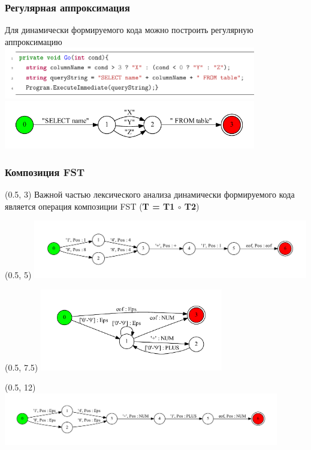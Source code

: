 \documentclass{beamer}
\begin{document}
\begin{frame}
  \transwipe[direction=90]
  \frametitle{Регулярная аппроксимация}
  Для динамически формируемого кода можно построить регулярную 
  аппроксимацию \\[2\baselineskip]
  \includegraphics[width=11cm]{pictures/approx_code.pdf} \\
  \includegraphics[width=11cm]{pictures/approx_fsa.pdf}
\end{frame}

\begin{frame}
  \transwipe[direction=90]
  \frametitle{Композиция FST}
  \begin{textblock}{12}(0.5, 3)
    Важной частью лексического анализа динамически формируемого
    кода является операция композиции FST (\textbf{T = T1 $\circ$ T2})
  \end{textblock}
  \begin{textblock}{12}(0.5, 5)
    \includegraphics[width=12cm]{pictures/example_.pdf}
  \end{textblock}
  \begin{textblock}{8}(0.5, 7.5)
    \includegraphics[width=8cm]{pictures/lexer_.pdf}
  \end{textblock}
  \begin{textblock}{12}(0.5, 12)
    \includegraphics[width=12cm]{pictures/res_.pdf}
  \end{textblock}
\end{frame}
\end{document}

